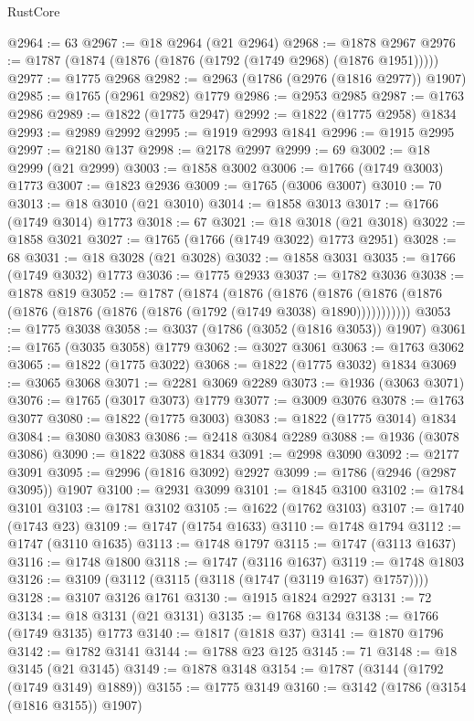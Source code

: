 \begin{lexlean}{RustCore}
\begin{coremodule}
@2964 := 63
@2967 := @18 @2964 (@21 @2964)
@2968 := @1878 @2967
@2976 := @1787 (@1874 (@1876 (@1876 (@1792 (@1749 @2968) (@1876 @1951)))))
@2977 := @1775 @2968
@2982 := @2963 (@1786 (@2976 (@1816 @2977)) @1907)
@2985 := @1765 (@2961 @2982) @1779
@2986 := @2953 @2985
@2987 := @1763 @2986
@2989 := @1822 (@1775 @2947)
@2992 := @1822 (@1775 @2958) @1834
@2993 := @2989 @2992
@2995 := @1919 @2993 @1841
@2996 := @1915 @2995
@2997 := @2180 @137
@2998 := @2178 @2997
@2999 := 69
@3002 := @18 @2999 (@21 @2999)
@3003 := @1858 @3002
@3006 := @1766 (@1749 @3003) @1773
@3007 := @1823 @2936
@3009 := @1765 (@3006 @3007)
@3010 := 70
@3013 := @18 @3010 (@21 @3010)
@3014 := @1858 @3013
@3017 := @1766 (@1749 @3014) @1773
@3018 := 67
@3021 := @18 @3018 (@21 @3018)
@3022 := @1858 @3021
@3027 := @1765 (@1766 (@1749 @3022) @1773 @2951)
@3028 := 68
@3031 := @18 @3028 (@21 @3028)
@3032 := @1858 @3031
@3035 := @1766 (@1749 @3032) @1773
@3036 := @1775 @2933
@3037 := @1782 @3036
@3038 := @1878 @819
@3052 := @1787
    (@1874
      (@1876
        (@1876
          (@1876 (@1876 (@1876 (@1876 (@1876 (@1876 (@1876 (@1792 (@1749 @3038) @1890)))))))))))
@3053 := @1775 @3038
@3058 := @3037 (@1786 (@3052 (@1816 @3053)) @1907)
@3061 := @1765 (@3035 @3058) @1779
@3062 := @3027 @3061
@3063 := @1763 @3062
@3065 := @1822 (@1775 @3022)
@3068 := @1822 (@1775 @3032) @1834
@3069 := @3065 @3068
@3071 := @2281 @3069 @2289
@3073 := @1936 (@3063 @3071)
@3076 := @1765 (@3017 @3073) @1779
@3077 := @3009 @3076
@3078 := @1763 @3077
@3080 := @1822 (@1775 @3003)
@3083 := @1822 (@1775 @3014) @1834
@3084 := @3080 @3083
@3086 := @2418 @3084 @2289
@3088 := @1936 (@3078 @3086)
@3090 := @1822 @3088 @1834
@3091 := @2998 @3090
@3092 := @2177 @3091
@3095 := @2996 (@1816 @3092) @2927
@3099 := @1786 (@2946 (@2987 @3095)) @1907
@3100 := @2931 @3099
@3101 := @1845 @3100
@3102 := @1784 @3101
@3103 := @1781 @3102
@3105 := @1622 (@1762 @3103)
@3107 := @1740 (@1743 @23)
@3109 := @1747 (@1754 @1633)
@3110 := @1748 @1794
@3112 := @1747 (@3110 @1635)
@3113 := @1748 @1797
@3115 := @1747 (@3113 @1637)
@3116 := @1748 @1800
@3118 := @1747 (@3116 @1637)
@3119 := @1748 @1803
@3126 := @3109 (@3112 (@3115 (@3118 (@1747 (@3119 @1637) @1757))))
@3128 := @3107 @3126 @1761
@3130 := @1915 @1824 @2927
@3131 := 72
@3134 := @18 @3131 (@21 @3131)
@3135 := @1768 @3134
@3138 := @1766 (@1749 @3135) @1773
@3140 := @1817 (@1818 @37)
@3141 := @1870 @1796
@3142 := @1782 @3141
@3144 := @1788 @23 @125
@3145 := 71
@3148 := @18 @3145 (@21 @3145)
@3149 := @1878 @3148
@3154 := @1787 (@3144 (@1792 (@1749 @3149) @1889))
@3155 := @1775 @3149
@3160 := @3142 (@1786 (@3154 (@1816 @3155)) @1907)

\end{coremodule}
\end{lexlean}
